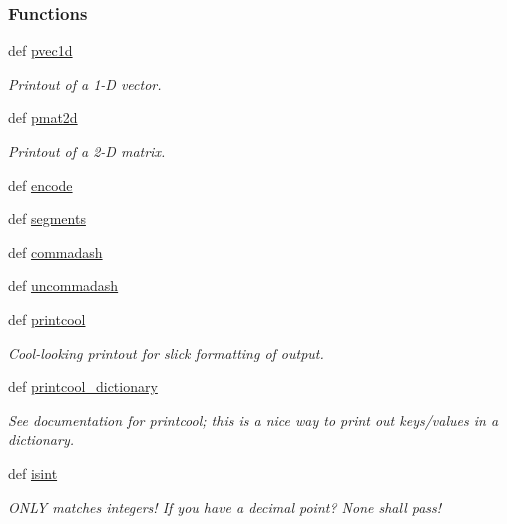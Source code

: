 \subsubsection*{\-Functions}
\begin{DoxyCompactItemize}
\item 
def \hyperlink{namespaceforcebalance_1_1nifty_a27e3a9dc144a5ad505509ac9ede08d7d}{pvec1d}
\begin{DoxyCompactList}\small\item\em \-Printout of a 1-\/\-D vector. \end{DoxyCompactList}\item 
def \hyperlink{namespaceforcebalance_1_1nifty_af61d76c8eb78c8ee52a43e239ff26cb4}{pmat2d}
\begin{DoxyCompactList}\small\item\em \-Printout of a 2-\/\-D matrix. \end{DoxyCompactList}\item 
def \hyperlink{namespaceforcebalance_1_1nifty_a3b437964dc22735bf8a7dcbaf99e413d}{encode}
\item 
def \hyperlink{namespaceforcebalance_1_1nifty_a3b9fd8e29c5d8f1b2114e4d9662dfd61}{segments}
\item 
def \hyperlink{namespaceforcebalance_1_1nifty_a9628ee448710667747d8aa5dc166532c}{commadash}
\item 
def \hyperlink{namespaceforcebalance_1_1nifty_afa670d68f01813ac8d429bc5cbdb4f9f}{uncommadash}
\item 
def \hyperlink{namespaceforcebalance_1_1nifty_a11babd62dc7bca389162c6318f9672ca}{printcool}
\begin{DoxyCompactList}\small\item\em \-Cool-\/looking printout for slick formatting of output. \end{DoxyCompactList}\item 
def \hyperlink{namespaceforcebalance_1_1nifty_a51180e960742cc7547749fdfb3513ec4}{printcool\-\_\-dictionary}
\begin{DoxyCompactList}\small\item\em \-See documentation for printcool; this is a nice way to print out keys/values in a dictionary. \end{DoxyCompactList}\item 
def \hyperlink{namespaceforcebalance_1_1nifty_a3f1c7a1af9d35d5d1693074bc6f5497c}{isint}
\begin{DoxyCompactList}\small\item\em \-O\-N\-L\-Y matches integers! \-If you have a decimal point? \-None shall pass! \end{DoxyCompactList}\item 

\end{DoxyCompactItemize}
